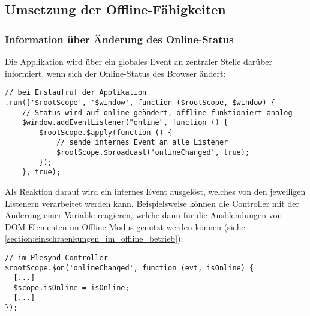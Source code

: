 \subsection{Umsetzung der Offline-Fähigkeiten}

\subsubsection{Information über Änderung des Online-Status}
Die Applikation wird über ein globales Event an zentraler Stelle darüber informiert, wenn sich der Online-Status des Browser ändert:
\begin{lstlisting}
// bei Erstaufruf der Applikation
.run(['$rootScope', '$window', function ($rootScope, $window) {
    // Status wird auf online geändert, offline funktioniert analog
    $window.addEventListener("online", function () {
        $rootScope.$apply(function () {
            // sende internes Event an alle Listener
            $rootScope.$broadcast('onlineChanged', true);
        });
    }, true);
\end{lstlisting}

Als Reaktion darauf wird ein internes Event ausgelöst, welches von den jeweiligen Listenern verarbeitet werden kann. Beispielsweise können die Controller mit der Änderung einer Variable reagieren, welche dann für die Ausblendungen von DOM-Elementen im Offline-Modus genutzt werden können (siehe \ref{section:einschraenkungen_im_offline_betrieb}):
\begin{lstlisting}
// im Plesynd Controller
$rootScope.$on('onlineChanged', function (evt, isOnline) {
  [...]
  $scope.isOnline = isOnline;
  [...]
});
\end{lstlisting}

